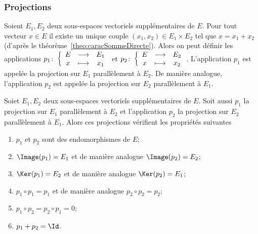 \subsubsection{Projections}
\label{sec:projections}

\begin{defdef}
  Soient $E_1, E_2$ deux sous-espaces vectoriels supplémentaires de $E$. Pour tout vecteur $x \in E$ il existe un unique couple $(x_1,x_2) \in E_1 \times E_2$ tel que $x=x_1+x_2$ (d'après le théorème~\ref{theo:caracSommeDirecte}). Alors on peut définir les applications $p_1\colon \left\{\begin{array}{ccc} E & \longrightarrow &E_1\\ x & \longmapsto & x_1 \end{array} \right.$ et $p_2\colon \left\{\begin{array}{ccc} E & \longrightarrow &E_2\\ x & \longmapsto & x_2 \end{array} \right.$. L'application $p_1$ est appelée la projection sur $E_1$ parallèlement à $E_2$. De manière analogue, l'application $p_2$ est appelée la projection sur $E_2$ parallèlement à $E_1$. 
\end{defdef}

\begin{theo}\label{theo:propprojection}
  Soiet $E_1, E_2$ deux sous-espaces vectoriels supplémentaires de $E$. Soit aussi $p_1$ la projection sur $E_1$ parallèlement à $E_2$ et l'application $p_2$ la projection sur $E_2$ parallèlement à $E_1$. Alors ces projections vérifient les propriétés suivantes
  \begin{enumerate}
  \item $p_1$ et $p_2$ sont des endomorphismes de $E$;
  \item $\Image(p_1)=E_1$ et de manière analogue $\Image(p_2)=E_2$;
  \item $\Ker(p_1)=E_2$ et de manière analogue $\Ker(p_2)=E_1$;
  \item $p_1 \circ p_1=p_1$ et de manière analogue $p_2 \circ p_2=p_2$;
  \item $p_1 \circ p_2 = p_2 \circ p_1=0$;
  \item $p_1+p_2=\Id$.
  \end{enumerate}
\end{theo}

